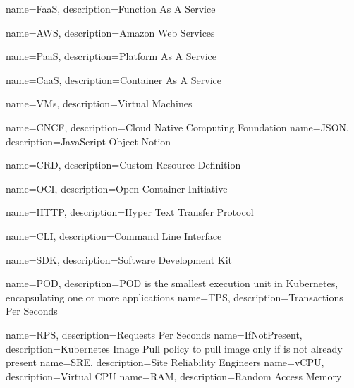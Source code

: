 {
    name=FaaS,
    description={Function As A Service}
}

{
    name=AWS,
    description={Amazon Web Services}
}

{
    name=PaaS,
    description={Platform As A Service}
}

{
    name=CaaS,
    description={Container As A Service}
}

{
    name=VMs,
    description={Virtual Machines}
}

{
    name=CNCF,
    description={Cloud Native Computing Foundation}
}
{
    name=JSON,
    description={JavaScript Object Notion}
}

{
    name=CRD,
    description={Custom Resource Definition}
}

{
    name=OCI,
    description={Open Container Initiative}
}

{
    name=HTTP,
    description={Hyper Text Transfer Protocol}
}

{
    name=CLI,
    description={Command Line Interface}
}

{
    name=SDK,
    description={Software Development Kit}
}

{
    name=POD,
    description={POD is the smallest execution unit in Kubernetes, encapsulating one or more applications}
}
{
    name=TPS,
    description={Transactions Per Seconds}
}

{
    name=RPS,
    description={Requests Per Seconds}
}
{
    name=IfNotPresent,
    description={Kubernetes Image Pull policy to pull image only if is not already present}
}
{
    name=SRE,
    description={Site Reliability Engineers}
}
{
    name=vCPU,
    description={Virtual CPU }
}
{
    name=RAM,
    description={Random Access Memory }
}
